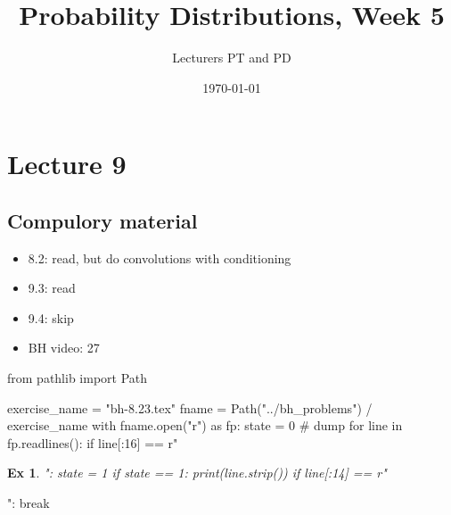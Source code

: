 \documentclass[a4paper,11pt]{article}
\author{Lecturers PT and PD
}
\date{\today}
\title{Probability Distributions, Week 5}
\newtheorem{exercise}[theorem]{Ex}
\begin{document}
\maketitle
\tableofcontents

\section{Lecture 9}
\label{sec:lecture-1}

\subsection{Compulory material}
\label{sec:compulory-material}


\begin{itemize}
\item 8.2: read, but do convolutions with conditioning
\item 9.3: read
\item 9.4: skip
\item BH video: 27
\end{itemize}


\begin{pycode}
from pathlib import Path

exercise_name = "bh-8.23.tex"
fname = Path("../bh_problems") / exercise_name
with fname.open("r") as fp:
    state = 0  # dump
    for line in fp.readlines():
        if line[:16] == r"\begin{exercise}":
            state = 1
        if state == 1:
            print(line.strip())
        if line[:14] == r"\end{exercise}":
            break
\end{pycode}
\end{document}
